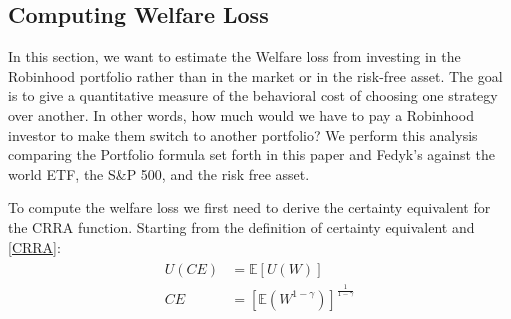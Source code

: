 %
%

\subsection{Computing Welfare Loss}
In this section, we want to estimate the Welfare loss from investing in the Robinhood portfolio rather than in the market or in the risk-free asset.
The goal is to give a quantitative measure of the behavioral cost of choosing one strategy over another.
In other words, how much would we have to pay a Robinhood investor to make them switch to another portfolio?
We perform this analysis comparing the Portfolio formula set forth in this paper and Fedyk's against the world ETF, the S\&P 500, and the risk free asset. 

To compute the welfare loss we first need to derive the certainty equivalent for the CRRA function.
Starting from the definition of certainty equivalent and \ref{CRRA}:
\begin{align}
\begin{split}
    U(CE) &= \mathbb{E}[U(W)] \\
    CE &= \left[\mathbb{E}(W^{1-\gamma})\right]^{\frac{1}{1-\gamma}}
\end{split}
\label{ce_crra}
\end{align}

